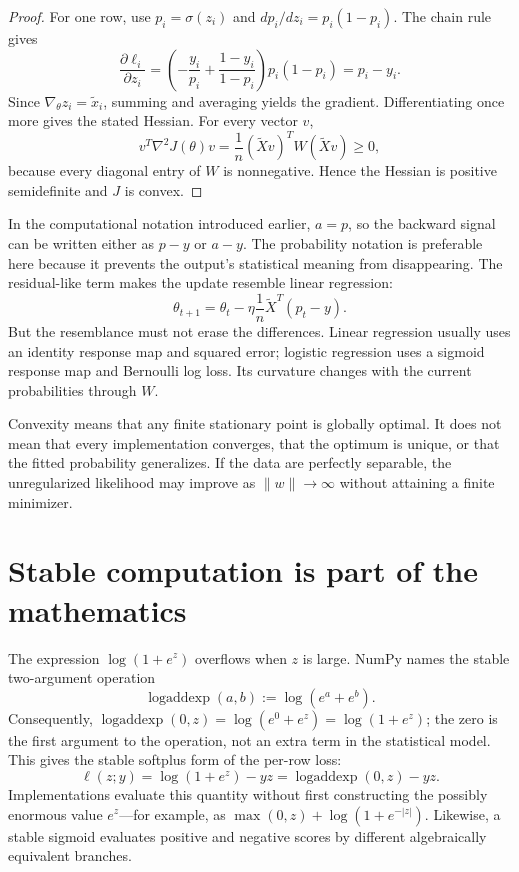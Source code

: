\begin{proof}
For one row, use $p_i=\sigma(z_i)$ and
$dp_i/dz_i=p_i(1-p_i)$. The chain rule gives
\[
\frac{\partial\ell_i}{\partial z_i}
=\left(-\frac{y_i}{p_i}+\frac{1-y_i}{1-p_i}\right)
p_i(1-p_i)
=p_i-y_i.
\]
Since $\nabla_\theta z_i=\widetilde x_i$, summing and averaging yields the
gradient. Differentiating once more gives the stated Hessian. For every vector
$v$,
\[
v^T\nabla^2J(\theta)v
=\frac1n(\widetilde Xv)^TW(\widetilde Xv)\ge0,
\]
because every diagonal entry of $W$ is nonnegative. Hence the Hessian is
positive semidefinite and $J$ is convex.
\end{proof}

In the computational notation introduced earlier, $a=p$, so the backward
signal can be written either as $p-y$ or $a-y$. The probability notation is
preferable here because it prevents the output's statistical meaning from
disappearing. The residual-like term makes the update resemble linear
regression:
\[
\theta_{t+1}
=\theta_t-\eta\frac1n\widetilde X^T(p_t-y).
\]
But the resemblance must not erase the differences. Linear regression usually
uses an identity response map and squared error; logistic regression uses a
sigmoid response map and Bernoulli log loss. Its curvature changes with the
current probabilities through $W$.

Convexity means that any finite stationary point is globally optimal. It does
not mean that every implementation converges, that the optimum is unique, or
that the fitted probability generalizes. If the data are perfectly separable,
the unregularized likelihood may improve as $\lVert w\rVert\to\infty$ without
attaining a finite minimizer.

\section{Stable computation is part of the mathematics}

The expression $\log(1+e^z)$ overflows when $z$ is large. NumPy names the
stable two-argument operation
\[
\operatorname{logaddexp}(a,b) := \log\!\left(e^a+e^b\right).
\]
Consequently,
$\operatorname{logaddexp}(0,z)=\log(e^0+e^z)=\log(1+e^z)$; the zero is the
first argument to the operation, not an extra term in the statistical model.
This gives the stable softplus form of the per-row loss:
\[
\ell(z;y)=\log(1+e^z)-yz
=\operatorname{logaddexp}(0,z)-yz.
\]
Implementations evaluate this quantity without first constructing the possibly
enormous value $e^z$---for example, as
$\max(0,z)+\log(1+e^{-|z|})$.
Likewise, a stable sigmoid evaluates positive and negative scores by different
algebraically equivalent branches.

